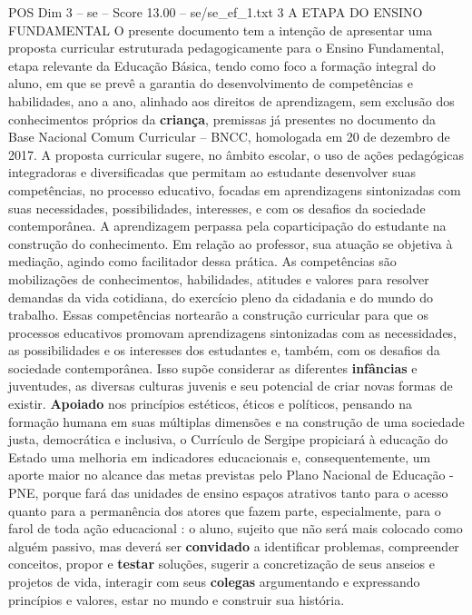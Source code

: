 \begin{textsample}{POS Dim 3 – se – Score 13.00 – se/se\_ef\_1.txt}  \label{ex:f3_pos_166}
3 A ETAPA DO ENSINO FUNDAMENTAL O presente documento tem a intenção de apresentar uma proposta curricular estruturada pedagogicamente para o Ensino Fundamental, etapa relevante da Educação Básica, tendo como foco a formação integral do aluno, em que se prevê a garantia do desenvolvimento de competências e habilidades, ano a ano, alinhado aos direitos de aprendizagem, sem exclusão dos conhecimentos próprios da \textbf{criança}, premissas já presentes no documento da Base Nacional Comum Curricular – BNCC, homologada em 20 de dezembro de 2017.
A proposta curricular sugere, no âmbito escolar, o uso de ações pedagógicas integradoras e diversificadas que permitam ao estudante desenvolver suas competências, no processo educativo, focadas em aprendizagens sintonizadas com suas necessidades, possibilidades, interesses, e com os desafios da sociedade contemporânea.
A aprendizagem perpassa pela coparticipação do estudante na construção do conhecimento.
Em relação ao professor, sua atuação se objetiva à mediação, agindo como facilitador dessa prática.
As competências são mobilizações de conhecimentos, habilidades, atitudes e valores para resolver demandas da vida cotidiana, do exercício pleno da cidadania e do mundo do trabalho.
Essas competências nortearão a construção curricular para que os processos educativos promovam aprendizagens sintonizadas com as necessidades, as possibilidades e os interesses dos estudantes e, também, com os desafios da sociedade contemporânea.
Isso supõe considerar as diferentes \textbf{infâncias} e juventudes, as diversas culturas juvenis e seu potencial de criar novas formas de existir. \textbf{Apoiado} nos princípios estéticos, éticos e políticos, pensando na formação humana em suas múltiplas dimensões e na construção de uma sociedade justa, democrática e inclusiva, o Currículo de Sergipe propiciará à educação do Estado uma melhoria em indicadores educacionais e, consequentemente, um aporte maior no alcance das metas previstas pelo Plano Nacional de Educação - PNE, porque fará das unidades de ensino espaços atrativos tanto para o acesso quanto para a permanência dos atores que fazem parte, especialmente, para o farol de toda ação educacional : o aluno, sujeito que não será mais colocado como alguém passivo, mas deverá ser \textbf{convidado} a identificar problemas, compreender conceitos, propor e \textbf{testar} soluções, sugerir a concretização de seus anseios e projetos de vida, interagir com seus \textbf{colegas} argumentando e expressando princípios e valores, estar no mundo e construir sua história.

\end{textsample}
